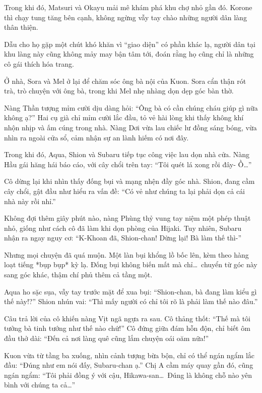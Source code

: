 \documentclass[../main.tex]{subfiles}
\begin{document}
Trong khi đó, Matsuri và Okayu mải mê khám phá khu chợ nhỏ gần đó. Korone thì chạy tung tăng bên cạnh, không ngừng vẫy tay chào những người dân làng thân thiện.

Dẫu cho họ gặp một chút khó khăn vì ``giao diện'' có phần khác lạ, người dân tại khu làng này cũng không mảy may bận tâm tới, đoán rằng họ cũng chỉ là những cô gái thích hóa trang.

\ct

Ở nhà, Sora và Mel ở lại để chăm sóc ông bà nội của Kuon. Sora cẩn thận rót trà, trò chuyện với ông bà, trong khi Mel nhẹ nhàng dọn dẹp góc bàn thờ.

Nàng Thần tượng mỉm cười dịu dàng hỏi: ``Ông bà có cần chúng cháu giúp gì nữa không ạ?'' Hai cụ già chỉ mỉm cười lắc đầu, tỏ vẻ hài lòng khi thấy không khí nhộn nhịp và ấm cúng trong nhà. Nàng Dơi vừa lau chiếc lư đồng sáng bóng, vừa nhìn ra ngoài cửa sổ, cảm nhận sự an lành hiếm có nơi đây.

\ct

Trong khi đó, Aqua, Shion và Subaru tiếp tục công việc lau dọn nhà cửa. Nàng Hầu gái hăng hái báo cáo, với cây chổi trên tay: ``Tôi quét lá xong rồi đây- Ồ\dots''

Cô dừng lại khi nhìn thấy đống bụi và mạng nhện đầy góc nhà. Shion, đang cầm cây chổi, gật đầu như hiểu ra vấn đề: ``Có vẻ như chúng ta lại phải dọn cả cái nhà này rồi nhỉ.''

Không đợi thêm giây phút nào, nàng Phùng thỷ vung tay niệm một phép thuật nhỏ, giống như cách cô đã làm khi dọn phòng của Hijaki. Tuy nhiên, Subaru nhận ra ngay nguy cơ: ``K-Khoan đã, Shion-chan! Dừng lại! Bà làm thế thì-''

Nhưng mọi chuyện đã quá muộn. Một làn bụi khổng lồ bốc lên, kèm theo hàng loạt tiếng *bụp bụp* kỳ lạ. Đống bụi không biến mất mà chỉ\dots\ chuyển từ góc này sang góc khác, thậm chí phủ thêm cả tầng một.

Aqua ho sặc sụa, vẫy tay trước mặt để xua bụi: ``Shion-chan, bà đang làm kiểu gì thế này!?'' Shion nhún vai: ``Thì mấy người có chỉ tôi rõ là phải làm thế nào đâu.''

Câu trả lời của cô khiến nàng Vịt ngã ngựa ra sau. Cô thảng thốt: ``Thế mà tôi tưởng bà tinh tướng như thế nào chứ!'' Cô đứng giữa đám hỗn độn, chỉ biết ôm đầu thở dài: ``Đến cả nơi làng quê cũng lắm chuyện oái oăm nữa!''

Kuon vừa từ tầng ba xuống, nhìn cảnh tượng bừa bộn, chỉ có thể ngán ngẩm lắc đầu: ``Đúng như em nói đấy, Subaru-chan ạ.'' Chị A cầm máy quay gần đó, cũng ngán ngẩm: ``Tôi phải đồng ý với cậu, Hikawa-san\dots\ Đúng là không chỗ nào yên bình với chúng ta cả\dots ''
\end{document}
